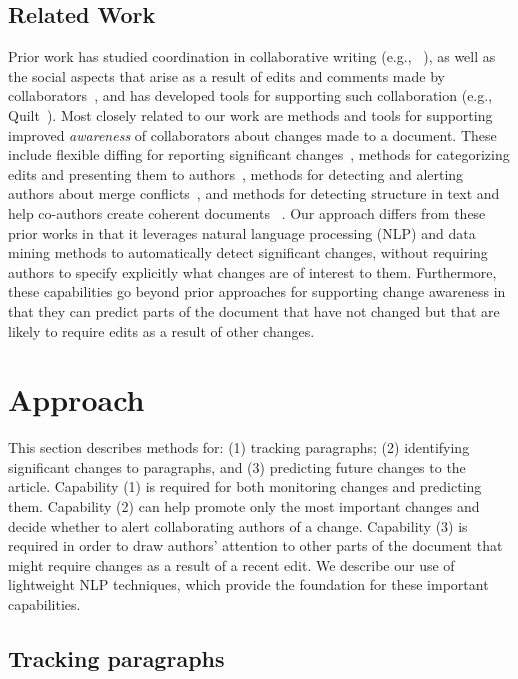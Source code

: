 \subsection{Related Work}\label{related-work}

Prior work has studied coordination in collaborative writing (e.g.,
~\cite{neuwirth2001computer,kittur2007he}), as well as the social
aspects that arise as a result of edits and comments made by
collaborators~\cite{birnholtz2013write}, and has developed tools for
supporting such collaboration (e.g., Quilt~\cite{fish1988quilt}). Most
closely related to our work are methods and tools for supporting
improved \emph{awareness} of collaborators about changes made to a
document. These include flexible diffing for reporting significant
changes~\cite{neuwirth1992flexible}, methods for categorizing edits and
presenting them to
authors~\cite{fong2010did,papadopoulou2007structured,tam2006framework},
methods for detecting and alerting authors about merge
conflicts~\cite{hainsworth2006enabling}, and methods for detecting
structure in text and help co-authors create coherent documents~
\cite{de2007narrative}. Our approach differs from these prior works in
that it leverages natural language processing (NLP) and data mining
methods to automatically detect significant changes, without requiring
authors to specify explicitly what changes are of interest to them.
Furthermore, these capabilities go beyond prior approaches for
supporting change awareness in that they can predict parts of the
document that have not changed but that are likely to require edits as a
result of other changes.

\section{Approach}\label{approach}

This section describes methods for: (1) tracking paragraphs; (2)
identifying significant changes to paragraphs, and (3) predicting future
changes to the article. Capability (1) is required for both monitoring
changes and predicting them. Capability (2) can help promote only the
most important changes and decide whether to alert collaborating authors
of a change. Capability (3) is required in order to draw authors'
attention to other parts of the document that might require changes as a
result of a recent edit. We describe our use of lightweight NLP
techniques, which provide the foundation for these important
capabilities.

\subsection{Tracking paragraphs}\label{tracking-paragraphs}

